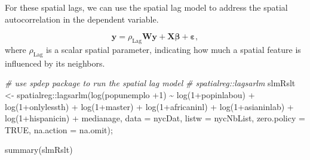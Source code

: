 \documentclass[
  11pt,
]{book}
\newenvironment{Shaded}{\begin{snugshade}}{\end{snugshade}}
\newcommand{\AttributeTok}[1]{\textcolor[rgb]{0.77,0.63,0.00}{#1}}
\newcommand{\CommentTok}[1]{\textcolor[rgb]{0.56,0.35,0.01}{\textit{#1}}}
\newcommand{\ConstantTok}[1]{\textcolor[rgb]{0.00,0.00,0.00}{#1}}
\newcommand{\DecValTok}[1]{\textcolor[rgb]{0.00,0.00,0.81}{#1}}
\newcommand{\FunctionTok}[1]{\textcolor[rgb]{0.00,0.00,0.00}{#1}}
\newcommand{\NormalTok}[1]{#1}
\newcommand{\OtherTok}[1]{\textcolor[rgb]{0.56,0.35,0.01}{#1}}
\newcommand{\SpecialCharTok}[1]{\textcolor[rgb]{0.00,0.00,0.00}{#1}}
\begin{document}
For these spatial lags, we can use the spatial lag model to address the spatial autocorrelation in the dependent variable.

\[
{\mathbf y} = \rho_{\mathrm{Lag}} {\mathbf W}{\mathbf y} + {\mathbf X}{\mathbf \beta} + {\mathbf \varepsilon},
\]
where \(\rho_{\mathrm{Lag}}\) is a scalar spatial parameter, indicating how much a spatial feature is influenced by its neighbors.

\begin{Shaded}
\begin{Highlighting}[]
\CommentTok{\# use spdep package to run the spatial lag model }
\CommentTok{\# spatialreg::lagsarlm }
\NormalTok{slmRslt }\OtherTok{\textless{}{-}}\NormalTok{ spatialreg}\SpecialCharTok{::}\FunctionTok{lagsarlm}\NormalTok{(}\FunctionTok{log}\NormalTok{(popunemplo }\SpecialCharTok{+}\DecValTok{1}\NormalTok{) }\SpecialCharTok{\textasciitilde{}} \FunctionTok{log}\NormalTok{(}\DecValTok{1}\SpecialCharTok{+}\NormalTok{popinlabou) }\SpecialCharTok{+}
                \FunctionTok{log}\NormalTok{(}\DecValTok{1}\SpecialCharTok{+}\NormalTok{onlylessth) }\SpecialCharTok{+} \FunctionTok{log}\NormalTok{(}\DecValTok{1}\SpecialCharTok{+}\NormalTok{master) }\SpecialCharTok{+} 
                \FunctionTok{log}\NormalTok{(}\DecValTok{1}\SpecialCharTok{+}\NormalTok{africaninl) }\SpecialCharTok{+} \FunctionTok{log}\NormalTok{(}\DecValTok{1}\SpecialCharTok{+}\NormalTok{asianinlab) }\SpecialCharTok{+} 
                \FunctionTok{log}\NormalTok{(}\DecValTok{1}\SpecialCharTok{+}\NormalTok{hispanicin) }\SpecialCharTok{+}\NormalTok{ medianage,}
              \AttributeTok{data =}\NormalTok{ nycDat,}
              \AttributeTok{listw =}\NormalTok{ nycNbList,}
              \AttributeTok{zero.policy =} \ConstantTok{TRUE}\NormalTok{, }
              \AttributeTok{na.action =}\NormalTok{ na.omit);}

\FunctionTok{summary}\NormalTok{(slmRslt)}
\end{Highlighting}
\end{Shaded}
\end{document}
